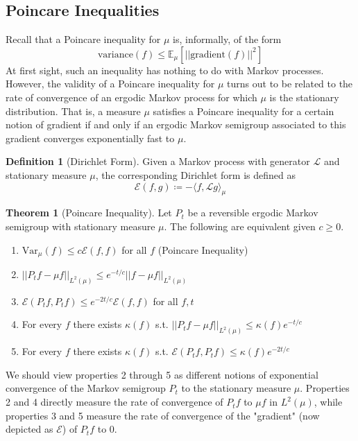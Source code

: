 \documentclass{article}
\theoremstyle{definition}
\newtheorem{theorem}{Theorem}[section]
\theoremstyle{remark}
\theoremstyle{definition}
\newtheorem{definition}{Definition}[section]
\begin{document}
  \subsection{Poincare Inequalities}

  Recall that a Poincare inequality for $\mu$ is, informally, of the form 
  \[\mathrm{variance}(f) \leq \mathbb{E}_\mu[ ||\mathrm{gradient}(f)||^2 ]\]
  At first sight, such an inequality has nothing to do with Markov processes. However, the validity of a Poincare inequality for $\mu$ turns out to be related to the rate of convergence of an ergodic Markov process for which $\mu$ is the stationary distribution. That is, a measure $\mu$ satisfies a Poincare inequality for a certain notion of gradient if and only if an ergodic Markov semigroup associated to this gradient converges exponentially fast to $\mu$. 

  \begin{definition}[Dirichlet Form]
  Given a Markov process with generator $\mathscr{L}$ and stationary measure $\mu$, the corresponding Dirichlet form is defined as 
  \[\mathcal{E}(f, g) \coloneqq - \langle f, \mathscr{L} g \rangle_\mu\]
  \end{definition}

  \begin{theorem}[Poincare Inequality]
  Let $P_t$ be a reversible ergodic Markov semigroup with stationary measure $\mu$. The following are equivalent given $c \geq 0$. 
  \begin{enumerate}
      \item $\mathrm{Var}_\mu (f) \leq c \mathcal{E}(f, f)$ for all $f$ (Poincare Inequality) 
      \item $||P_t f - \mu f||_{L^2 (\mu)} \leq e^{-t /c} ||f - \mu f||_{L^2 (\mu)}$
      \item $\mathcal{E}(P_t f, P_t f) \leq e^{-2t /c} \mathcal{E}(f, f)$ for all $f, t$
      \item For every $f$ there exists $\kappa (f)$ s.t. $||P_t f - \mu f||_{L^2 (\mu)} \leq \kappa(f) e^{-t/c}$
      \item For every $f$ there exists $\kappa (f)$ s.t. $\mathcal{E}(P_t f, P_t f) \leq \kappa(f) e^{-2t/c}$ 
  \end{enumerate}
  \end{theorem}

  We should view properties 2 through 5 as different notions of exponential convergence of the Markov semigroup $P_t$ to the stationary measure $\mu$. Properties 2 and 4 directly measure the rate of convergence of $P_t f$ to $\mu f$ in $L^2 (\mu)$, while properties 3 and 5 measure the rate of convergence of the "gradient" (now depicted as $\mathcal{E}$) of $P_t f$ to $0$. 
\end{document}
